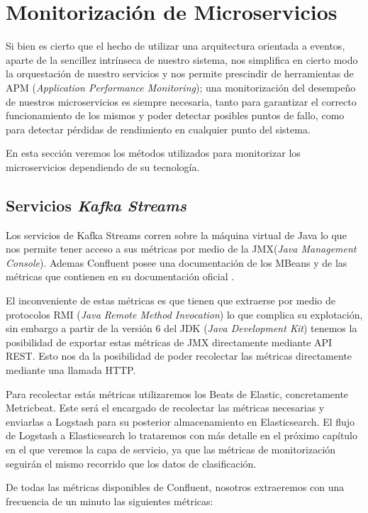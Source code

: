 \section{Monitorización de Microservicios}

Si bien es cierto que el hecho de utilizar una arquitectura orientada a eventos, aparte de la sencillez intrínseca de nuestro sistema, nos simplifica en cierto modo la orquestación de nuestro servicios y nos permite prescindir de herramientas de APM (\textit{Application Performance Monitoring}); una monitorización del desempeño de nuestros microservicios es siempre necesaria, tanto para garantizar el correcto funcionamiento de los mismos y poder detectar posibles puntos de fallo, como para detectar pérdidas de rendimiento en cualquier punto del sistema. 

En esta sección veremos los métodos utilizados para monitorizar los microservicios dependiendo de su tecnología. 


\subsection{Servicios \textit{Kafka Streams}}

Los servicios de Kafka Streams corren sobre la máquina virtual de Java lo que nos permite tener acceso a sus métricas por medio de la JMX(\textit{Java Management Console}). Ademas Confluent posee una documentación de los MBeans y de las métricas que contienen en su documentación oficial \cite{monitoringstreams}. 


El inconveniente de estas métricas es que tienen que extraerse por medio de protocolos RMI (\textit{Java Remote Method Invocation}) lo que complica su explotación, sin embargo a partir de la versión 6 del JDK (\textit{Java Development Kit}) tenemos la posibilidad de exportar estas métricas de JMX directamente mediante API REST. Esto nos da la posibilidad de poder recolectar las métricas directamente mediante una llamada HTTP.

Para recolectar estás métricas utilizaremos los Beats de  Elastic, concretamente Metricbeat. Este será el encargado de recolectar las métricas necesarias y enviarlas a Logstash para su posterior almacenamiento en Elasticsearch. El flujo de Logstash a Elasticsearch lo trataremos con más detalle en el próximo capítulo en el que veremos la capa de servicio, ya que las métricas de monitorización seguirán el mismo recorrido que los datos de clasificación. 


De todas las métricas disponibles de Confluent, nosotros extraeremos con una frecuencia de un minuto las siguientes métricas:

